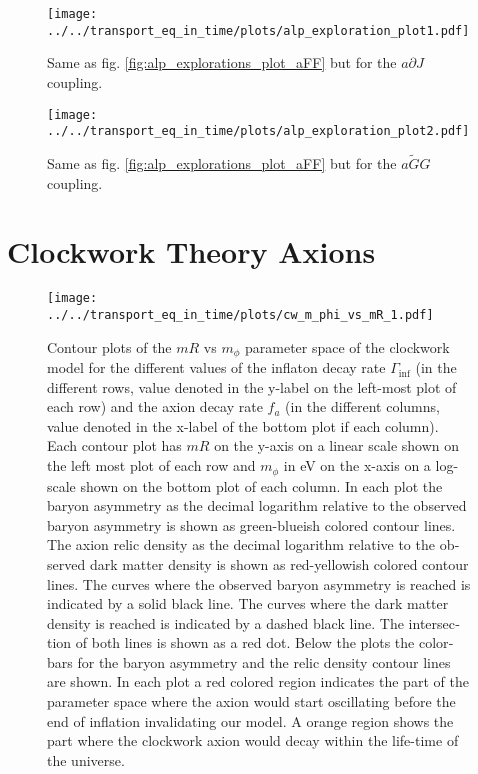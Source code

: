 \documentclass[master,       %
               twoside,        %
               BCOR10mm,       %
               english,ngerman, %
               ]{GAUBM}
\begin{document}
\begin{otherlanguage}{english}
\begin{figure}[h]
    \texttt{[image: ../../transport\_eq\_in\_time/plots/alp\_exploration\_plot1.pdf]}
    \caption{Same as fig. \ref{fig:alp_explorations_plot_aFF} but for the $a \partial J$ coupling.}
\end{figure}

\begin{figure}[h]
    \texttt{[image: ../../transport\_eq\_in\_time/plots/alp\_exploration\_plot2.pdf]}
    \caption{Same as fig. \ref{fig:alp_explorations_plot_aFF} but for the $a \tilde{G} G$ coupling.}
\end{figure}

\section{Clockwork Theory Axions}

\begin{figure}[h]
    \texttt{[image: ../../transport\_eq\_in\_time/plots/cw\_m\_phi\_vs\_mR\_1.pdf]}
    \caption{Contour plots of the $mR$ vs $m_\phi$ parameter space of the clockwork model for the different values of the inflaton decay rate $\Gamma_\mathrm{inf}$ (in the different rows, value denoted in the y-label on the left-most plot of each row) and the axion decay rate $f_a$ (in the different columns, value denoted in the x-label of the bottom plot if each column). Each contour plot has $mR$ on the y-axis on a linear scale shown on the left most plot of each row and $m_\phi$ in eV on the x-axis on a log-scale shown on the bottom plot of each column. In each plot the baryon asymmetry as the decimal logarithm relative to the observed baryon asymmetry is shown as green-blueish colored contour lines. The axion relic density as the decimal logarithm relative to the observed dark matter density is shown as red-yellowish  colored contour lines. The curves where the observed baryon asymmetry is reached is indicated by a solid black line. The curves where the dark matter density is reached is indicated by a dashed black line. The intersection of both lines is shown as a red dot. Below the plots the colorbars for the baryon asymmetry and the relic density contour lines are shown. In each plot a red colored region indicates the part of the parameter space where the axion would start oscillating before the end of inflation invalidating our model. A orange region shows the part where the clockwork axion would decay within the life-time of the universe. }
    \label{fig:clockwork_parameter_space_aFF}
\end{figure}


\end{otherlanguage}
\end{document}
